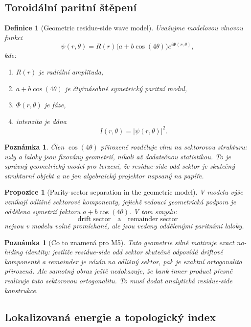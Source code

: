 \documentclass[11pt,a4paper]{article}
\newtheorem{definition}[theorem]{Definice}
\newtheorem{remark}[theorem]{Poznámka}
\newtheorem{proposition}[theorem]{Propozice}
\begin{document}
\subsection*{Toroidální paritní štěpení}

\begin{definition}[Geometric residue-side wave model]
Uvažujme modelovou vlnovou funkci
\[
\psi(r,\theta)=R(r)\bigl(a+b\cos(4\theta)\bigr)e^{i\Phi(r,\theta)},
\]
kde:
\begin{enumerate}[label=\textbf{(\arabic*)}]
    \item \(R(r)\) je radiální amplituda,
    \item \(a+b\cos(4\theta)\) je čtyřnásobně symetrický paritní modul,
    \item \(\Phi(r,\theta)\) je fáze,
    \item intenzita je dána
    \[
    I(r,\theta)=|\psi(r,\theta)|^2.
    \]
\end{enumerate}
\end{definition}

\begin{remark}
Člen \(\cos(4\theta)\) přirozeně rozděluje vlnu na sektorovou strukturu:
uzly a laloky jsou fixovány geometrií, nikoli až dodatečnou statistikou.
To je správný geometrický model pro tvrzení, že residue-side odd sektor je skutečný
strukturní objekt a ne jen algebraický projektor napsaný na papíře.
\end{remark}

\begin{proposition}[Parity-sector separation in the geometric model]
V modelu výše vznikají odlišné sektorové komponenty, jejichž vedoucí geometrická podpora
je oddělena symetrií faktoru \(a+b\cos(4\theta)\).
V tom smyslu:
\[
\text{drift sector} \quad\text{a}\quad \text{remainder sector}
\]
nejsou v modelu volně promíchané, ale jsou vedeny oddělenými paritními laloky.
\end{proposition}

\begin{remark}[Co to znamená pro M5]
Tato geometrie silně motivuje exact no-hiding identity:
jestliže residue-side odd sektor skutečně odpovídá driftové komponentě a remainder je vázán
na odlišný sektor, pak je exaktní ortogonalita přirozená.
Ale samotný obraz ještě nedokazuje, že bank inner product přesně realizuje tuto sektorovou ortogonalitu.
To musí dodat analytická residue-side konstrukce.
\end{remark}

\subsection*{Lokalizovaná energie a topologický index}
\end{document}
